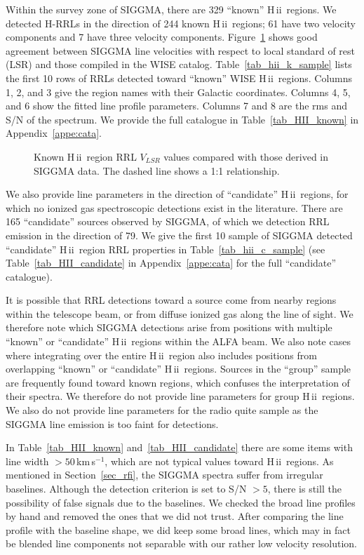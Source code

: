 \documentclass[manuscript]{aastex61}
\newcommand{\hii}{{\rm H\,}{{\sc ii}}}
\newcommand{\kms}{\,km\,s$^{-1}$}
\begin{document}
Within the survey zone of SIGGMA, there are 329 ``known'' \hii\ regions.
We detected H-RRLs in the direction of 244 known \hii\ regions; 61 have two velocity components and 7 have three velocity components.
Figure~\ref{vlsr_map} shows good agreement between SIGGMA line velocities with respect to local standard of rest (LSR) and those compiled in the WISE catalog.
Table~\ref{tab_hii_k_sample} lists the first 10 rows of RRLs detected toward ``known'' WISE \hii\ regions.
Columns 1, 2, and 3 give the region names with their Galactic coordinates.
Columns 4, 5, and 6 show the fitted line profile parameters. 
Columns 7 and 8 are the rms and S/N of the spectrum.
We provide the full catalogue in Table~\ref{tab_HII_known} in Appendix~\ref{appe:cata}.

\begin{figure}[htbp]
\caption{Known \hii\ region RRL $V_{LSR}$ values compared with
those derived in SIGGMA data.  The dashed line shows a 1:1 relationship.}\label{vlsr_map}
\end{figure}

We also provide line parameters in the direction of ``candidate'' \hii\ regions, for which no ionized gas spectroscopic detections exist in the literature.
There are 165 ``candidate'' sources observed by SIGGMA, of which we detection RRL emission in the direction of 79.
We give the first 10 sample of SIGGMA detected ``candidate'' \hii\ region RRL properties in Table~\ref{tab_hii_c_sample} (see Table~\ref{tab_HII_candidate} in Appendix~\ref{appe:cata} for the full ``candidate'' catalogue).

It is possible that RRL detections toward a source come from nearby regions within the telescope beam, or from diffuse ionized gas along the line of sight.
We therefore note which SIGGMA detections arise from positions with multiple ``known'' or ``candidate'' \hii\ regions within the ALFA beam.
We also note cases where integrating over the entire \hii\ region also includes positions from overlapping ``known'' or ``candidate'' \hii\ regions.
Sources in the ``group'' sample are frequently found toward known regions, which confuses the interpretation of their spectra.
We therefore do not provide line parameters for group \hii\ regions.
We also do not provide line parameters for the radio quite sample as the SIGGMA line emission is too faint for detections.

In Table~\ref{tab_HII_known} and~\ref{tab_HII_candidate} there are some items with line width $>50$\kms, which are not typical values toward \hii\ regions. 
As mentioned in Section~\ref{sec_rfi}, the SIGGMA spectra suffer from irregular baselines.
Although the detection criterion is set to S/N $>5$, there is still the possibility of false signals due to the baselines.
We checked the broad line profiles by hand and removed the ones that we did not trust.
After comparing the line profile with the baseline shape, we did keep some broad lines, which may in fact be blended line components not separable with our rather low velocity resolution.
\end{document}
